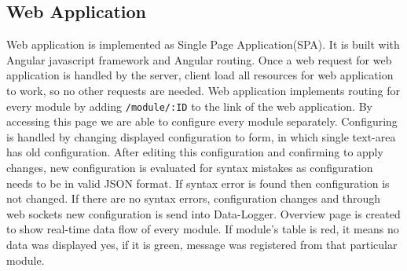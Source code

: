 \subsection{Web Application} %
\label{sub:web_application}
Web application is implemented as Single Page Application(SPA). It is built with Angular javascript framework and Angular routing. Once a web request for web application is handled by the server, client load all resources for web application to work, so no other requests are needed. Web application implements routing for every module by adding \verb|/module/:ID| to the link of the web application. By accessing this page we are able to configure every module separately. Configuring is handled by changing displayed configuration to form, in which single text-area has old configuration. After editing this configuration and confirming to apply changes, new configuration is evaluated for syntax mistakes as configuration needs to be in valid JSON format. If syntax error is found then configuration is not changed. If there are no syntax errors, configuration changes and through web sockets new configuration is send into Data-Logger.
Overview page is created to show real-time data flow of every module. If module's table is red, it means no data was displayed yes, if it is green, message was registered from that particular module.
